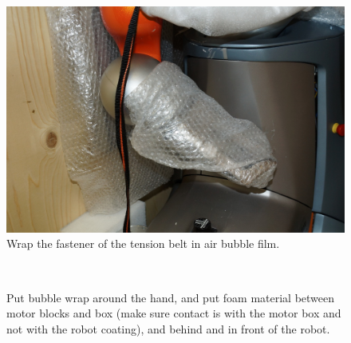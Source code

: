 \begin{figure}[h!]
\centering
\includegraphics[width=1\textwidth]{images/packing_09.jpg}\caption{Wrap the fastener of the tension belt in air bubble film.}
\end{figure}

\begin{figure}[h!]
\centering
\mbox{\quad
{}}
\caption{Put bubble wrap around the hand, and put foam material between motor blocks and box (make sure contact is with the motor box and not with the robot coating), and behind and in front of the robot.} %
\end{figure}

